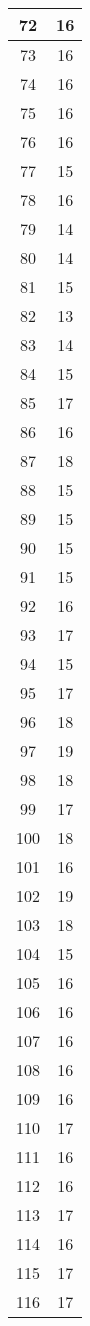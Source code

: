 \documentclass[letterpaper, 12pt]{article}
\begin{document}
\begin{longtable}{|c|c|}
\hline
72 & 16 \\
\hline
73 & 16 \\
\hline
74 & 16 \\
\hline
75 & 16 \\
\hline
76 & 16 \\
\hline
77 & 15 \\
\hline
78 & 16 \\
\hline
79 & 14 \\
\hline
80 & 14 \\
\hline
81 & 15 \\
\hline
82 & 13 \\
\hline
83 & 14 \\
\hline
84 & 15 \\
\hline
85 & 17 \\
\hline
86 & 16 \\
\hline
87 & 18 \\
\hline
88 & 15 \\
\hline
89 & 15 \\
\hline
90 & 15 \\
\hline
91 & 15 \\
\hline
92 & 16 \\
\hline
93 & 17 \\
\hline
94 & 15 \\
\hline
95 & 17 \\
\hline
96 & 18 \\
\hline
97 & 19 \\
\hline
98 & 18 \\
\hline
99 & 17 \\
\hline
100 & 18 \\
\hline
101 & 16 \\
\hline
102 & 19 \\
\hline
103 & 18 \\
\hline
104 & 15 \\
\hline
105 & 16 \\
\hline
106 & 16 \\
\hline
107 & 16 \\
\hline
108 & 16 \\
\hline
109 & 16 \\
\hline
110 & 17 \\
\hline
111 & 16 \\
\hline
112 & 16 \\
\hline
113 & 17 \\
\hline
114 & 16 \\
\hline
115 & 17 \\
\hline
116 & 17 \\

\end{longtable}
\end{document}
